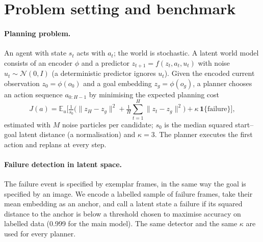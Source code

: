 \documentclass[preprint,12pt]{elsarticle}
\begin{document}


\section{Problem setting and benchmark}\label{sec:setting}

\paragraph{Planning problem.}
An agent with state $s_t$ acts with $a_t$; the world is stochastic.
A latent world model consists of an encoder $\phi$ and a predictor $z_{t+1}=f(z_t,a_t,u_t)$ with noise $u_t\sim\mathcal N(0,I)$ (a deterministic predictor ignores $u_t$).
Given the encoded current observation $z_0=\phi(o_0)$ and a goal embedding $z_g=\phi(o_g)$, a planner chooses an action sequence $a_{0:H-1}$ by minimising the expected planning cost
\begin{equation}\label{eq:cost}
J(a)=\mathbb E_u\Big[\tfrac1{s_0}\Big(\|z_H-z_g\|^2+\tfrac1H\textstyle\sum_{t=1}^{H}\|z_t-z_g\|^2\Big)+\kappa\,\mathbf 1\{\text{failure}\}\Big],
\end{equation}
estimated with $M$ noise particles per candidate; $s_0$ is the median squared start--goal latent distance (a normalisation) and $\kappa=3$.
The planner executes the first action and replans at every step.

\paragraph{Failure detection in latent space.}
The failure event is specified by exemplar frames, in the same way the goal is specified by an image.
We encode a labelled sample of failure frames, take their mean embedding as an anchor, and call a latent state a failure if its squared distance to the anchor is below a threshold chosen to maximise accuracy on labelled data (0.999 for the main model).
The same detector and the same $\kappa$ are used for every planner.
\end{document}
